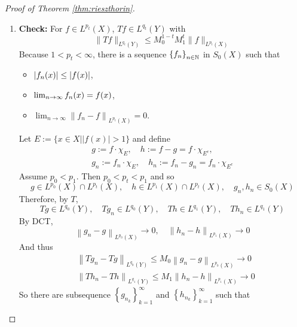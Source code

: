 \begin{proof}[Proof of Theorem \ref{thm:rieszthorin}]
\begin{enumerate}[label=(\Roman*)]
\begin{enumerate}[label=\theenumi-\arabic{*}]
			\item \textbf{Check:} For $f \in L^{p_t}(X)$, $Tf \in L^{q_t}(Y)$ with
			\begin{equation*}
				\|T f\|_{L^{q_t}(Y)} \leq M_0^{1-t} M_1^t\|f\|_{L^{p_t}(X)}
			\end{equation*}
			Because $1 < p_t < \infty$, there is a sequence $\left\{f_n\right\}_{n \in \mathbb{N}}$ in $S_0(X)$ such that
			\begin{itemize}
				\item $\left\lvert f_n(x)\right\lvert \leq \left\lvert f(x)\right\lvert$,
				\item $\lim_{n \rightarrow \infty}f_n(x) = f(x)$,
				\item $\lim _{n \rightarrow \infty}\left\|f_n-f\right\|_{L^{p_t}(X)}=0$.
			\end{itemize}
			Let $E:=\{x \in X| | f(x) \mid>1\}$ and define
			\begin{equation*}
				\begin{gathered}
					g:=f \cdot \chi_E, \quad h:=f-g=f \cdot \chi_{E^c}, \\
					g_n:=f_n \cdot \chi_E, \quad h_n:=f_n-g_n=f_n \cdot \chi_{E^c}
				\end{gathered}
			\end{equation*}
			Assume $p_0 < p_1$. Then $p_0 < p_ t < p_1$ and so
			\begin{equation*}
				g \in L^{p_0}(X) \cap L^{p_t}(X), \quad h \in L^{p_1}(X) \cap L^{p_t}(X), \quad g_n, h_n \in S_0(X)
			\end{equation*}
			Therefore, by $T$,
			\begin{equation*}
				T g \in L^{q_0}(Y), \quad T g_n \in L^{q_0}(Y), \quad T h \in L^{q_1}(Y), \quad T h_n \in L^{q_1}(Y)
			\end{equation*}
			By DCT,
			\begin{equation*}
				\left\|g_n-g\right\|_{L^{p_0}(X)} \longrightarrow 0, \quad\left\|h_n-h\right\|_{L^{p_1}(X)} \longrightarrow 0
			\end{equation*}
			And thus
			\begin{equation*}
				\begin{aligned}
					&\left\|T g_n-T g\right\|_{L^{q_0}(Y)} \leq M_0\left\|g_n-g\right\|_{L^{p_0}(X)} \longrightarrow 0 \\
					&\left\|T h_n-T h\right\|_{L^{q_1}(Y)} \leq M_1\left\|h_n-h\right\|_{L^{p_1}(X)} \longrightarrow 0
				\end{aligned}
			\end{equation*}
			So there are subsequence $\left\{g_{n_k}\right\}_{k=1}^{\infty}$ and $\left\{h_{n_k}\right\}_{k=1}^{\infty}$ such that

\end{enumerate}
\end{enumerate}
\end{proof}

